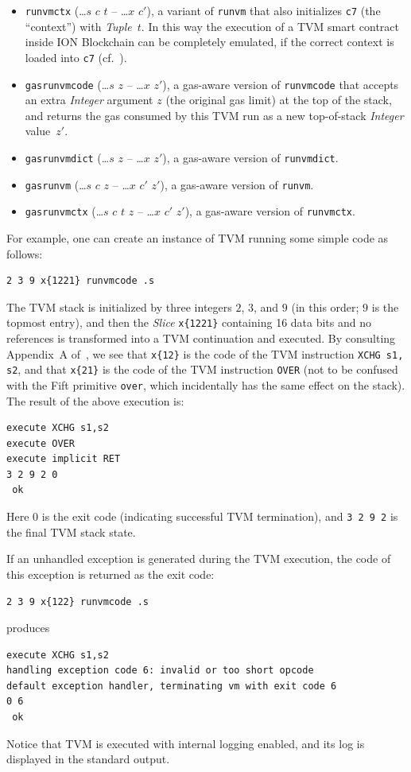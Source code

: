 \documentclass[12pt,oneside]{article}
\begin{document}
\begin{itemize}
\item {\tt runvmctx} (\dots $s$ $c$ $t$ -- \dots $x$ $c'$), a variant of {\tt runvm} that also initializes {\tt c7} (the ``context'') with {\em Tuple\/}~$t$. In this way the execution of a TVM smart contract inside ION Blockchain can be completely emulated, if the correct context is loaded into {\tt c7} (cf.~\cite[4.4.10]{TBC}).
\item {\tt gasrunvmcode} (\dots $s$ $z$ -- \dots $x$ $z'$), a gas-aware version of {\tt runvmcode} that accepts an extra {\em Integer\/} argument $z$ (the original gas limit) at the top of the stack, and returns the gas consumed by this TVM run as a new top-of-stack {\em Integer\/} value~$z'$.
\item {\tt gasrunvmdict} (\dots $s$ $z$ -- \dots $x$ $z'$), a gas-aware version of {\tt runvmdict}.
\item {\tt gasrunvm} (\dots $s$ $c$ $z$ -- \dots $x$ $c'$ $z'$), a gas-aware version of {\tt runvm}.
\item {\tt gasrunvmctx} (\dots $s$ $c$ $t$ $z$ -- \dots $x$ $c'$ $z'$), a gas-aware version of {\tt runvmctx}.
\end{itemize}
For example, one can create an instance of TVM running some simple code as follows:
\begin{verbatim}
2 3 9 x{1221} runvmcode .s
\end{verbatim}
The TVM stack is initialized by three integers $2$, $3$, and $9$ (in this order; $9$ is the topmost entry), and then the {\em Slice\/} {\tt x\{1221\}} containing 16 data bits and no references is transformed into a TVM continuation and executed. By consulting Appendix~A of~\cite{TVM}, we see that {\tt x\{12\}} is the code of the TVM instruction {\tt XCHG s1, s2}, and that {\tt x\{21\}} is the code of the TVM instruction {\tt OVER} (not to be confused with the Fift primitive {\tt over}, which incidentally has the same effect on the stack). The result of the above execution is:
\begin{verbatim}
execute XCHG s1,s2
execute OVER
execute implicit RET
3 2 9 2 0
 ok
\end{verbatim}
Here $0$ is the exit code (indicating successful TVM termination), and {\tt 3 2 9 2} is the final TVM stack state.

If an unhandled exception is generated during the TVM execution, the code of this exception is returned as the exit code:
\begin{verbatim}
2 3 9 x{122} runvmcode .s
\end{verbatim}
produces
\begin{verbatim}
execute XCHG s1,s2
handling exception code 6: invalid or too short opcode
default exception handler, terminating vm with exit code 6
0 6
 ok
\end{verbatim}
Notice that TVM is executed with internal logging enabled, and its log is displayed in the standard output.
\end{document}
